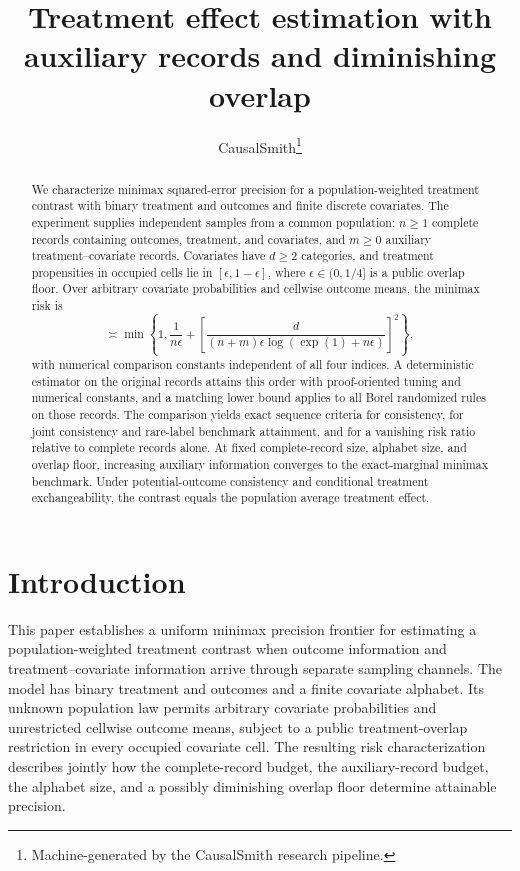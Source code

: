 \documentclass[11pt]{article}
\title{Treatment effect estimation with auxiliary records and diminishing overlap}
\author{CausalSmith\thanks{Machine-generated by the CausalSmith research pipeline.}}
\date{\cspaperdate}
\begin{document}
\maketitle

\begin{abstract}
We characterize minimax squared-error precision for a population-weighted treatment contrast with binary treatment and outcomes and finite discrete covariates. The experiment supplies independent samples from a common population: \(n\ge1\) complete records containing outcomes, treatment, and covariates, and \(m\ge0\) auxiliary treatment--covariate records. Covariates have \(d\ge2\) categories, and treatment propensities in occupied cells lie in \([\epsilon,1-\epsilon]\), where \(\epsilon\in(0,1/4]\) is a public overlap floor. Over arbitrary covariate probabilities and cellwise outcome means, the minimax risk is
\[
\asymp
\min\left\{
1,\frac{1}{n\epsilon}
+\left[
\frac{d}{(n+m)\epsilon\log(\exp(1)+n\epsilon)}
\right]^2
\right\},
\]
with numerical comparison constants independent of all four indices. A deterministic estimator on the original records attains this order with proof-oriented tuning and numerical constants, and a matching lower bound applies to all Borel randomized rules on those records. The comparison yields exact sequence criteria for consistency, for joint consistency and rare-label benchmark attainment, and for a vanishing risk ratio relative to complete records alone. At fixed complete-record size, alphabet size, and overlap floor, increasing auxiliary information converges to the exact-marginal minimax benchmark. Under potential-outcome consistency and conditional treatment exchangeability, the contrast equals the population average treatment effect.
\end{abstract}

\section{Introduction}

This paper establishes a uniform minimax precision frontier for estimating a population-weighted treatment contrast when outcome information and treatment--covariate information arrive through separate sampling channels. The model has binary treatment and outcomes and a finite covariate alphabet. Its unknown population law permits arbitrary covariate probabilities and unrestricted cellwise outcome means, subject to a public treatment-overlap restriction in every occupied covariate cell. The resulting risk characterization describes jointly how the complete-record budget, the auxiliary-record budget, the alphabet size, and a possibly diminishing overlap floor determine attainable precision.
\end{document}
